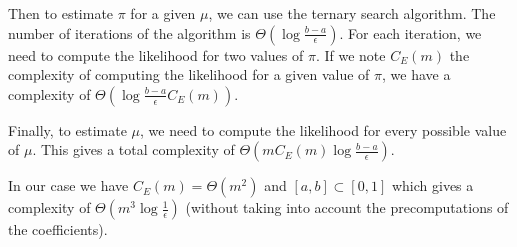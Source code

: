 Then to estimate $\pi$ for a given $\mu$, we can use the ternary search algorithm. The number of iterations of the algorithm is $\Theta(\log \frac{b - a}{\epsilon})$. For each iteration, we need to compute the likelihood for two values of $\pi$. If we note $C_E(m)$ the complexity of computing the likelihood for a given value of $\pi$, we have a complexity of $\Theta(\log \frac{b - a}{\epsilon} C_E(m))$.

Finally, to estimate $\mu$, we need to compute the likelihood for every possible value of $\mu$. This gives a total complexity of $\Theta(m C_E(m) \log \frac{b - a}{\epsilon} )$.

In our case we have $C_E(m) = \Theta(m^2)$ and $[a, b] \subset [0, 1]$ which gives a complexity of $\Theta(m^3 \log \frac{1}{\epsilon})$ (without taking into account the precomputations of the coefficients).
